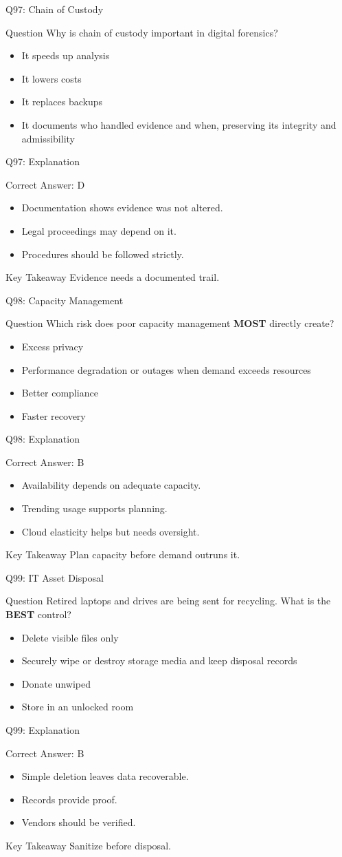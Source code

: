 \documentclass[aspectratio=169]{beamer}
\newcommand{\hq}[7]{%
	\begin{frame}{Q#1: #2}
		\begin{block}{Question}
			#3
		\end{block}
		\begin{itemize}
			#4
		\end{itemize}
	\end{frame}
	\begin{frame}{Q#1: Explanation}
		\begin{block}{Correct Answer: #5}
			\begin{itemize}
				#6
			\end{itemize}
		\end{block}
		\begin{alertblock}{Key Takeaway}
			#7
		\end{alertblock}
	\end{frame}
}
\begin{document}
	\hq{97}{Chain of Custody}
	{Why is chain of custody important in digital forensics?}
	{\item[\textbf{(A)}] It speeds up analysis
		\item[\textbf{(B)}] It lowers costs
		\item[\textbf{(C)}] It replaces backups
		\item[\textbf{(D)}] It documents who handled evidence and when, preserving its integrity and admissibility}
	{D}
	{\item Documentation shows evidence was not altered.
		\item Legal proceedings may depend on it.
		\item Procedures should be followed strictly.}
	{Evidence needs a documented trail.}
	
	\hq{98}{Capacity Management}
	{Which risk does poor capacity management \textbf{MOST} directly create?}
	{\item[\textbf{(A)}] Excess privacy
		\item[\textbf{(B)}] Performance degradation or outages when demand exceeds resources
		\item[\textbf{(C)}] Better compliance
		\item[\textbf{(D)}] Faster recovery}
	{B}
	{\item Availability depends on adequate capacity.
		\item Trending usage supports planning.
		\item Cloud elasticity helps but needs oversight.}
	{Plan capacity before demand outruns it.}
	
	\hq{99}{IT Asset Disposal}
	{Retired laptops and drives are being sent for recycling. What is the \textbf{BEST} control?}
	{\item[\textbf{(A)}] Delete visible files only
		\item[\textbf{(B)}] Securely wipe or destroy storage media and keep disposal records
		\item[\textbf{(C)}] Donate unwiped
		\item[\textbf{(D)}] Store in an unlocked room}
	{B}
	{\item Simple deletion leaves data recoverable.
		\item Records provide proof.
		\item Vendors should be verified.}
	{Sanitize before disposal.}
	
\end{document}
